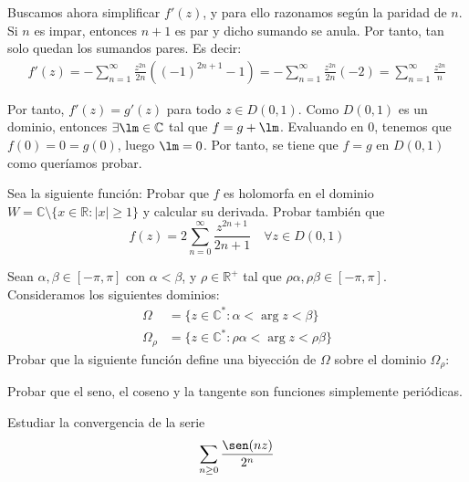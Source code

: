 \begin{ejercicio}
\begin{enumerate}
        Buscamos ahora simplificar $f'(z)$, y para ello razonamos según la paridad de $n$. Si $n$ es impar, entonces $n+1$ es par y dicho sumando se anula. Por tanto, tan solo quedan los sumandos pares. Es decir:
        \begin{align*}
            f'(z) = -\sum_{n=1}^\infty \frac{z^{2n}}{2n}\left((-1)^{2n+1}-1\right) = -\sum_{n=1}^\infty \frac{z^{2n}}{2n}\left(-2\right) = \sum_{n=1}^\infty \frac{z^{2n}}{n}
        \end{align*}

        Por tanto, $f'(z)=g'(z)$ para todo $z\in D(0,1)$. Como $D(0,1)$ es un dominio, entonces $\exists \lm\in \bb{C}$ tal que $f=g+\lm$. Evaluando en $0$, tenemos que $f(0)=0=g(0)$, luego $\lm=0$. Por tanto, se tiene que $f=g$ en $D(0,1)$ como queríamos probar.
    \end{enumerate}
\end{ejercicio}

\begin{ejercicio}
    Sea la siguiente función:
    Probar que $f$ es holomorfa en el dominio $W = \mathbb{C} \setminus \{x \in \mathbb{R} : |x| \geq 1\}$ y calcular su derivada. Probar también que
    \[
        f(z) = 2\sum_{n=0}^\infty \frac{z^{2n+1}}{2n+1} \quad \forall z \in D(0,1)
    \]
\end{ejercicio}

\begin{ejercicio}
    Sean $\alpha,\beta \in \left[ -\pi, \pi \right]$ con $\alpha < \beta$, y $\rho \in \mathbb{R}^+$ tal que $\rho\alpha,\rho\beta \in \left[ -\pi, \pi \right]$. Consideramos los siguientes dominios:
    \begin{align*}
        \Omega &= \{z \in \mathbb{C}^* : \alpha < \arg z < \beta\} \\
        \Omega_\rho &= \{z \in \mathbb{C}^* : \rho\alpha < \arg z < \rho\beta\}
    \end{align*}
    Probar que la siguiente función define una biyección de $\Omega$ sobre el dominio $\Omega_\rho$:
\end{ejercicio}

\begin{ejercicio}
    Probar que el seno, el coseno y la tangente son funciones simplemente periódicas.
\end{ejercicio}

\begin{ejercicio}
    Estudiar la convergencia de la serie
    \[
        \sum_{n\geq 0} \frac{\sen(nz)}{2^n}
    \]
\end{ejercicio}

